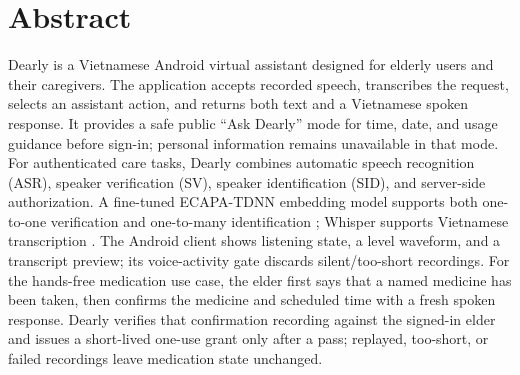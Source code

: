 \section*{Abstract}
Dearly is a Vietnamese Android virtual assistant designed for elderly users and their caregivers. The application accepts recorded speech, transcribes the request, selects an assistant action, and returns both text and a Vietnamese spoken response. It provides a safe public ``Ask Dearly'' mode for time, date, and usage guidance before sign-in; personal information remains unavailable in that mode. For authenticated care tasks, Dearly combines automatic speech recognition (ASR), speaker verification (SV), speaker identification (SID), and server-side authorization. A fine-tuned ECAPA-TDNN embedding model supports both one-to-one verification and one-to-many identification \cite{ecapa,speechbrain}; Whisper supports Vietnamese transcription \cite{whisper}. The Android client shows listening state, a level waveform, and a transcript preview; its voice-activity gate discards silent/too-short recordings. For the hands-free medication use case, the elder first says that a named medicine has been taken, then confirms the medicine and scheduled time with a fresh spoken response. Dearly verifies that confirmation recording against the signed-in elder and issues a short-lived one-use grant only after a pass; replayed, too-short, or failed recordings leave medication state unchanged.
